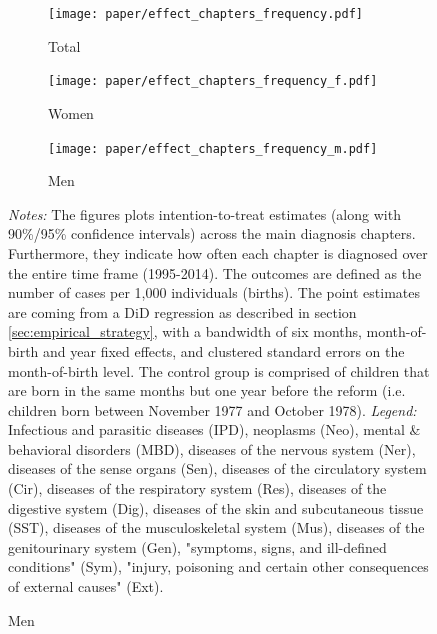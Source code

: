 \documentclass[11pt, a4paper]{article} %
\begin{document}
\begin{landscape}
	\vspace*{\fill}
	\begin{figure}[H]\centering
		\caption{Intention-to-treat effects across \textbf{main diagnosis chapters}}\label{fig: DD_across_main chapters}
		\begin{subfigure}[h]{0.31\linewidth}\centering\caption{Total}
			\texttt{[image: paper/effect\_chapters\_frequency.pdf]}
		\end{subfigure}
		\begin{subfigure}[h]{0.31\linewidth}\centering\caption{Women}
			\texttt{[image: paper/effect\_chapters\_frequency\_f.pdf]}
		\end{subfigure}
		\begin{subfigure}[h]{0.31\linewidth}\centering\caption{Men}
			\texttt{[image: paper/effect\_chapters\_frequency\_m.pdf]}
		\end{subfigure}
		\scriptsize
		\begin{minipage}{\linewidth}
			\emph{Notes:} The figures plots intention-to-treat estimates (along with 90\%/95\% confidence intervals) across the main diagnosis chapters. Furthermore, they indicate how often each chapter is diagnosed over the entire time frame (1995-2014). The outcomes are defined as the number of cases per 1,000 individuals (births). The point estimates are coming from a DiD regression as described in section \ref{sec:empirical_strategy}, with a bandwidth of six months, month-of-birth and year fixed effects, and clustered standard errors on the month-of-birth level. The control group is comprised of children	that are born in the same months but one year before the reform (i.e. children born between November 1977 and October 1978). \newline
			\emph{Legend:} Infectious and parasitic diseases (IPD), neoplasms (Neo), mental \& behavioral disorders (MBD), diseases of the nervous system (Ner), diseases of the sense organs (Sen), diseases of the circulatory system (Cir), diseases of the respiratory system (Res), diseases of the digestive system (Dig), diseases of the skin and subcutaneous tissue (SST), diseases of the musculoskeletal system (Mus), diseases of the genitourinary system (Gen), "symptoms, signs, and ill-defined conditions" (Sym), "injury, poisoning and certain other consequences of external causes" (Ext).
			
		\end{minipage}
	\end{figure}
	\vspace*{\fill}\clearpage
\end{landscape}
\end{document}
